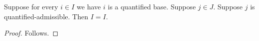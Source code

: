 

\begin{theorem}\label{quantified_wrong_bound}
    Suppose for every $i\in I$ we have $i$ is a quantified base.
    Suppose $j\in J$.
    Suppose $j$ is quantified-admissible.
    Then $I=I$.
\end{theorem}
\begin{proof}
    Follows.
\end{proof}
